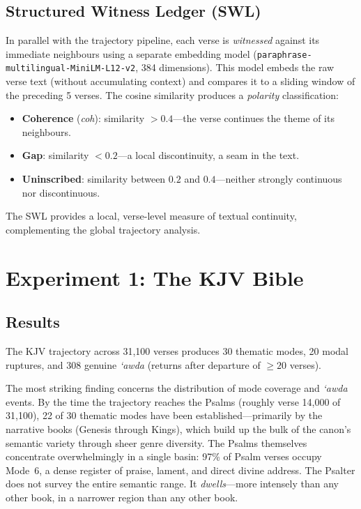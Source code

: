 \documentclass[11pt,a4paper]{article}
\theoremstyle{definition}
\begin{document}
\subsection{Structured Witness Ledger (SWL)}

In parallel with the trajectory pipeline, each verse is \emph{witnessed} against its immediate neighbours using a separate embedding model (\texttt{paraphrase-multilingual-MiniLM-L12-v2}, 384 dimensions). This model embeds the raw verse text (without accumulating context) and compares it to a sliding window of the preceding 5 verses. The cosine similarity produces a \emph{polarity} classification:

\begin{itemize}[nosep]
  \item \textbf{Coherence} (\emph{coh}): similarity $> 0.4$---the verse continues the theme of its neighbours.
  \item \textbf{Gap}: similarity $< 0.2$---a local discontinuity, a seam in the text.
  \item \textbf{Uninscribed}: similarity between $0.2$ and $0.4$---neither strongly continuous nor discontinuous.
\end{itemize}

The SWL provides a local, verse-level measure of textual continuity, complementing the global trajectory analysis.


\section{Experiment 1: The KJV Bible}

\subsection{Results}

The KJV trajectory across 31,100 verses produces 30 thematic modes, 20 modal ruptures, and 308 genuine \emph{`awda} (returns after departure of $\geq 20$ verses).

The most striking finding concerns the distribution of mode coverage and \emph{`awda} events. By the time the trajectory reaches the Psalms (roughly verse 14,000 of 31,100), 22 of 30 thematic modes have been established---primarily by the narrative books (Genesis through Kings), which build up the bulk of the canon's semantic variety through sheer genre diversity. The Psalms themselves concentrate overwhelmingly in a single basin: 97\% of Psalm verses occupy Mode~6, a dense register of praise, lament, and direct divine address. The Psalter does not survey the entire semantic range. It \emph{dwells}---more intensely than any other book, in a narrower region than any other book.
\end{document}
